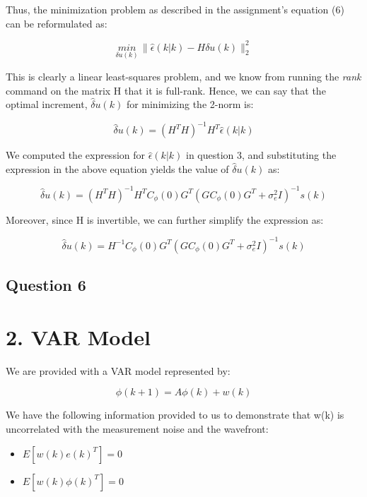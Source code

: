 \documentclass[12pt]{report}
\begin{document}
Thus, the minimization problem as described in the assignment's equation (6) can be reformulated as:

\begin{equation*}
	\underset{\delta u(k)}{min} \, \|\hat\epsilon(k|k) - H\delta u(k)\|_{2}^{2}
\end{equation*}

This is clearly a linear least-squares problem, and we know from running the \textit{rank} command on the matrix H that it is full-rank. Hence, we can say that the optimal increment, $\hat\delta u(k)$ for minimizing the 2-norm is:

\begin{equation*}
\hat\delta u(k) = (H^{T}H)^{-1}H^{T}\hat\epsilon(k|k)
\end{equation*}

We computed the expression for $\hat\epsilon(k|k)$ in question 3, and substituting the expression in the above equation yields the value of $\hat\delta u(k)$ as:

\begin{equation*}
\hat\delta u(k) = (H^{T}H)^{-1}H^{T}C_{\phi}(0)G^{T}(GC_{\phi}(0)G^{T} + \sigma_{e}^{2}I)^{-1}s(k)
\end{equation*}

Moreover, since H is invertible, we can further simplify the expression as:

\begin{equation*}
\hat\delta u(k) = H^{-1}C_{\phi}(0)G^{T}(GC_{\phi}(0)G^{T} + \sigma_{e}^{2}I)^{-1}s(k)
\end{equation*}

\subsection*{Question 6}



\section*{2. VAR Model}

We are provided with a VAR model represented by:

\begin{equation}\label{eq:var_eqn}
	\phi(k+1) = A\phi(k) + w(k)
\end{equation}

We have the following information provided to us to demonstrate that w(k) is uncorrelated with the measurement noise and the wavefront:
\begin{itemize}
\item $E\left[w(k)e(k)^{T}\right] = 0$
\item $E\left[w(k)\phi(k)^{T}\right] = 0$
\end{itemize}
\end{document}
